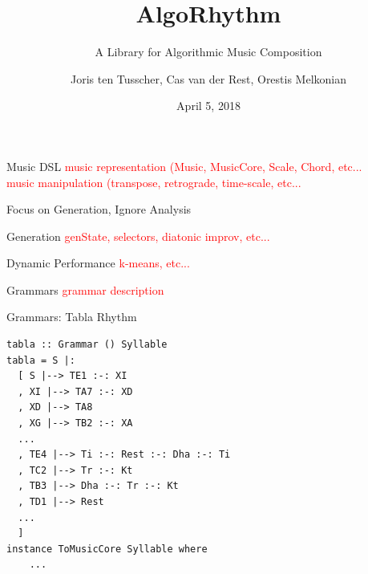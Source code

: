 \documentclass{beamer}
\title{AlgoRhythm}
\subtitle{A Library for Algorithmic Music Composition}
\author{Joris ten Tusscher, Cas van der Rest, Orestis Melkonian}
\date{April 5, 2018}
\institute{Universiteit Utrecht}
\newcommand\todo[1]{\textcolor{red}{#1}}
\begin{document}
	\maketitle
	
	\begin{frame}{Music DSL}
	\todo{music representation (Music, MusicCore, Scale, Chord, etc...}\\
	\todo{music manipulation (transpose, retrograde, time-scale, etc...}\\
	\end{frame}
		
	{
	\begin{frame}{Focus on Generation, Ignore Analysis}
	\end{frame}
	}	
	
	\begin{frame}{Generation}
	\todo{genState, selectors, diatonic improv, etc...}
	\end{frame}
	
	\begin{frame}{Dynamic Performance}
	\todo{k-means, etc...}
	\end{frame}
	
	\begin{frame}{Grammars}
	\todo{grammar description}\\
	\end{frame}
	
	\begin{frame}[fragile=singleslide]{Grammars: Tabla Rhythm}
	\begin{verbatim}
tabla :: Grammar () Syllable
tabla = S |:
  [ S |--> TE1 :-: XI
  , XI |--> TA7 :-: XD
  , XD |--> TA8
  , XG |--> TB2 :-: XA
  ...
  , TE4 |--> Ti :-: Rest :-: Dha :-: Ti
  , TC2 |--> Tr :-: Kt
  , TB3 |--> Dha :-: Tr :-: Kt
  , TD1 |--> Rest
  ...
  ]
instance ToMusicCore Syllable where
    ...
	\end{verbatim}
	\end{frame}
	
\end{document}
